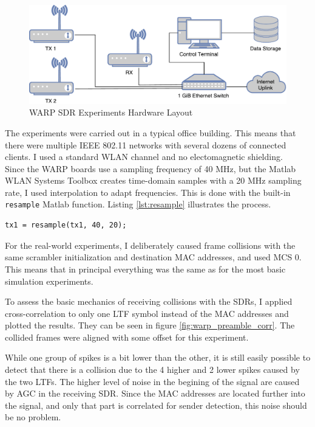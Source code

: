 \begin{figure}[H]
	\centering
	\includegraphics[width=\textwidth]{gfx/images/warp-layout}
	\caption{WARP SDR Experiments Hardware Layout}
	\label{fig:warp-layout}
\end{figure}

The experiments were carried out in a typical office building. This means that there were multiple IEEE 802.11 networks with several dozens of connected clients. I used a standard WLAN channel and no electomagnetic shielding.\\

Since the \gls{WARP} boards use a sampling frequency of 40 MHz, but the Matlab WLAN Systems Toolbox creates time-domain samples with a 20 MHz sampling rate, I used interpolation to adapt frequencies. This is done with the built-in \texttt{resample} Matlab function. Listing \ref{lst:resample} illustrates the process.

\begin{lstlisting}[captionpos=b,caption={Interpolate Sampling Rate},label=lst:resample]
% Interpolate to get from 20 to 40 MHz sampling rate
tx1 = resample(tx1, 40, 20);
\end{lstlisting}

For the real-world experiments, I deliberately caused frame collisions with the same scrambler initialization and destination MAC addresses, and used \gls{MCS} 0. This means that in principal everything was the same as for the most basic simulation experiments.

To assess the basic mechanics of receiving collisions with the \glspl{SDR}, I applied cross-correlation to only one \gls{LTF} symbol instead of the MAC addresses and plotted the results. They can be seen in figure \ref{fig:warp_preamble_corr}. The collided frames were aligned with some offset for this experiment.

While one group of spikes is a bit lower than the other, it is still easily possible to detect that there is a collision due to the 4 higher and 2 lower spikes caused by the two \glspl{LTF}. The higher level of noise in the begining of the signal are caused by \gls{AGC} in the receiving \gls{SDR}. Since the MAC addresses are located further into the signal, and only that part is correlated for sender detection, this noise should be no problem.

